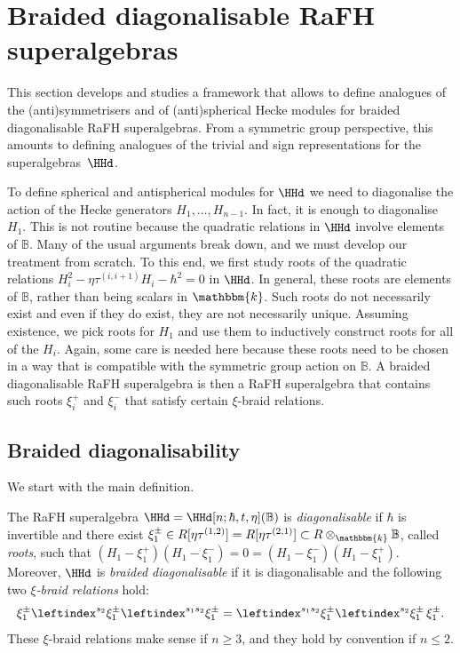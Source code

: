 \documentclass[a4paper,11pt]{amsart}
\numberwithin{equation}{subsection}
\theoremstyle{definition}
\theoremstyle{theorem}
\theoremstyle{remark}
\newcommand\taui[1][i]{\tau^{(#1)}}
\newcommand\kk{\mathbbm{k}}
\newcommand{\Bo}{\mathbb{B}}
\begin{document}
\section{Braided diagonalisable RaFH superalgebras}\label{S:Diagonalisable}
This section develops and studies a framework that allows to define
analogues of the (anti)symmetrisers and of (anti)spherical
Hecke modules for braided diagonalisable RaFH superalgebras. From a symmetric
group perspective, this amounts to defining analogues of the trivial and
sign representations for the superalgebras~$\HHd$.

To define spherical and antispherical modules for $\HHd$ we need to diagonalise
the action of the Hecke generators $H_1,\dots,H_{n-1}$. In fact, it is
enough to diagonalise $H_1$. This is not routine because the quadratic relations in
$\HHd$ involve elements of $\Bo$. Many of the usual arguments break down, and we must
develop our treatment from scratch. To this end, we first study
roots of the quadratic relations $H_i^2-\eta\tau^{(i,i+1)}H_i-\hbar^2=0$
in $\HHd$.  In general, these roots are elements of $\Bo$, rather than
being scalars in $\kk$. Such roots do not necessarily exist
and even if they do exist, they are not necessarily unique. Assuming
existence, we pick roots for $H_1$ and use them to inductively
construct roots for all of the $H_i$. Again, some care is needed here
because these roots need to be chosen in a way that is compatible with
the symmetric group action on $\Bo$. A braided diagonalisable RaFH
superalgebra is then a RaFH superalgebra that contains such roots $\xi^+_i$ and
$\xi^-_i$ that satisfy certain $\xi$-braid relations.

  \subsection{Braided diagonalisability}\label{SS:Diagonalisable}
  We start with the main definition.
  \begin{Definition}\label{D:Diagonalisable}
    The RaFH superalgebra $\HHd=\HHd[n;\hbar, t, \eta](\Bo)$ is \emph{diagonalisable} if $\hbar$ is
    invertible and there exist
    $\xi_{1}^\pm\in R[\eta\taui[1,2]]=R[\eta\taui[2,1]]\subset R\otimes_\kk\Bo$, called \emph{roots},  such that
    $(H_1-\xi_{1}^+)(H_1-\xi_{1}^-)=0=(H_1-\xi_{1}^-)(H_1-\xi_{1}^+)$. Moreover,  $\HHd$ is \emph{braided diagonalisable} if it is diagonalisable and
    the following two \emph{$\xi$-braid relations} hold:
    \begin{equation}\label{etabraid}
    \xi_1^\pm\leftindex^{s_2}{{\xi_1^\pm}}\leftindex^{s_1s_2}{{\xi_1^\pm}}
    =\leftindex^{s_1s_2}{{\xi_1^\pm}}\leftindex^{s_2}{{\xi_1^\pm}}\,\xi_1^\pm.
    \end{equation}
    These $\xi$-braid relations make sense if $n\geq3$, and they hold by convention if
  $n\leq2$.
  \end{Definition}
\end{document}
